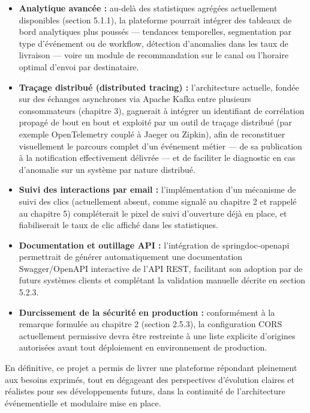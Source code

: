 \documentclass[12pt,a4paper]{report}
\begin{document}
\begin{itemize}
  \item \textbf{Analytique avancée :} au-delà des statistiques agrégées actuellement disponibles (section 5.1.1), la plateforme pourrait intégrer des tableaux de bord analytiques plus poussés --- tendances temporelles, segmentation par type d'événement ou de workflow, détection d'anomalies dans les taux de livraison --- voire un module de recommandation sur le canal ou l'horaire optimal d'envoi par destinataire.
  \item \textbf{Traçage distribué (distributed tracing) :} l'architecture actuelle, fondée sur des échanges asynchrones via Apache Kafka entre plusieurs consommateurs (chapitre 3), gagnerait à intégrer un identifiant de corrélation propagé de bout en bout et exploité par un outil de traçage distribué (par exemple OpenTelemetry couplé à Jaeger ou Zipkin), afin de reconstituer visuellement le parcours complet d'un événement métier --- de sa publication à la notification effectivement délivrée --- et de faciliter le diagnostic en cas d'anomalie sur un système par nature distribué.
  \item \textbf{Suivi des interactions par email :} l'implémentation d'un mécanisme de suivi des clics (actuellement absent, comme signalé au chapitre 2 et rappelé au chapitre 5) compléterait le pixel de suivi d'ouverture déjà en place, et fiabiliserait le taux de clic affiché dans les statistiques.
  \item \textbf{Documentation et outillage API :} l'intégration de springdoc-openapi permettrait de générer automatiquement une documentation Swagger/OpenAPI interactive de l'API REST, facilitant son adoption par de futurs systèmes clients et complétant la validation manuelle décrite en section 5.2.3.
  \item \textbf{Durcissement de la sécurité en production :} conformément à la remarque formulée au chapitre 2 (section 2.5.3), la configuration CORS actuellement permissive devra être restreinte à une liste explicite d'origines autorisées avant tout déploiement en environnement de production.
\end{itemize}

En définitive, ce projet a permis de livrer une plateforme répondant pleinement aux besoins exprimés, tout en dégageant des perspectives d'évolution claires et réalistes pour ses développements futurs, dans la continuité de l'architecture événementielle et modulaire mise en place.
\end{document}
